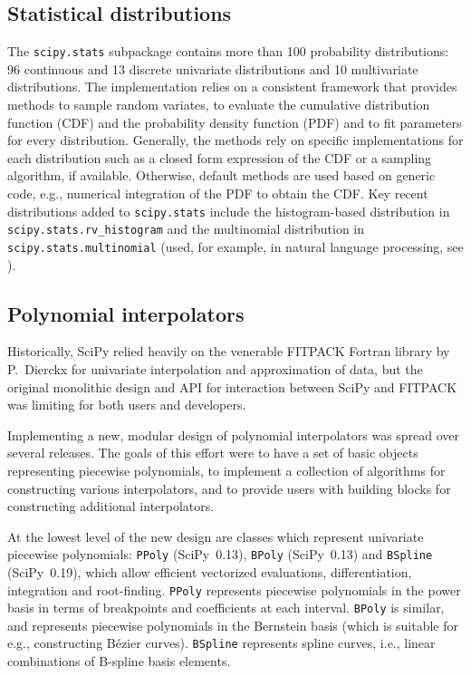 \documentclass[fleqn,10pt]{wlscirep}
\newcommand{\code}[1]{\texttt{#1}}
\begin{document}
 
\subsection*{Statistical distributions}

The \texttt{scipy.stats} subpackage contains more than 100 probability
distributions: 96 continuous and 13 discrete univariate distributions
and 10 multivariate distributions. The implementation relies on a
consistent framework that provides methods to sample random variates,
to evaluate the cumulative distribution function (CDF) and the probability
density function (PDF) and to fit parameters for every distribution.
Generally, the methods rely on specific implementations for each
distribution such as a closed form expression of the CDF or a sampling
algorithm, if available. Otherwise, default methods are used
based on generic code, e.g., numerical integration of the PDF to
obtain the CDF\@.
Key recent distributions added to \texttt{scipy.stats} include the
histogram-based distribution in \texttt{scipy.stats.rv\_histogram}
and the multinomial distribution in \texttt{scipy.stats.multinomial}
(used, for example, in natural language processing, see
\cite{Griffiths5228}).

\subsection*{Polynomial interpolators}

Historically, SciPy relied heavily on the venerable FITPACK
Fortran library by P.~Dierckx \cite{Dierckx:1993:CSF:151103, FITPACK} for
univariate interpolation and approximation of data, but the original monolithic
design and API for interaction between SciPy and FITPACK was limiting for both
users and developers.

Implementing a new, modular design of polynomial interpolators was spread over
several releases. The goals of this effort were to have a set of basic objects
representing piecewise polynomials, to implement a collection of algorithms
for constructing various interpolators, and to provide users with building
blocks for constructing additional interpolators.

At the lowest level of the new design are classes which represent univariate
piecewise polynomials: \code{PPoly} (SciPy~0.13)\cite{scipy-gh2885},
\code{BPoly} (SciPy~0.13) and \code{BSpline} (SciPy~0.19)\cite{scipy-gh3174},
which allow
efficient vectorized evaluations, differentiation, integration and root-finding.
\code{PPoly} represents piecewise polynomials in the power basis in terms of
breakpoints and coefficients at each interval. \code{BPoly} is similar, and
represents piecewise polynomials in the Bernstein basis (which is suitable
for e.g., constructing B\'{e}zier curves). \code{BSpline} represents spline
curves, i.e., linear combinations of B-spline basis elements.\cite{deBoor1978}
\end{document}
